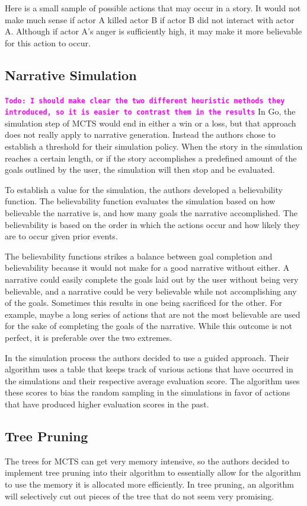 \documentclass{sig-alternate}
\newcommand{\comment}[1]{{\bf \tt  {#1}}}
\newcommand{\todo}[1]{\textcolor{magenta}{\comment{Todo: {#1}}}}
\begin{document}
Here is a small sample of possible actions that may occur in a story. It would not make much sense if actor A killed actor B if actor B did not interact with actor A. Although if actor A's anger is sufficiently high, it may make it more believable for this action to occur\cite{Narrative}.

\subsection{Narrative Simulation}
\todo{I should make clear the two different heuristic methods they introduced, so it is easier to contrast them in the results}
In Go, the simulation step of MCTS would end in either a win or a loss, but that approach does not really apply to narrative generation. Instead the authors chose to establish a threshold for their simulation policy. When the story in the simulation reaches a certain length, or if the story accomplishes a predefined amount of the goals outlined by the user, the simulation will then stop and be evaluated.

To establish a value for the simulation, the authors developed a believability function. The believability function evaluates the simulation based on how believable the narrative is, and how many goals the narrative accomplished. The believability is based on the order in which the actions occur and how likely they are to occur given prior events.

The believability functions strikes a balance between goal completion and believability because it would not make for a good narrative without either. A narrative could easily complete the goals laid out by the user without being very believable, and a narrative could be very believable while not accomplishing any of the goals. Sometimes this results in one being sacrificed for the other. For example, maybe a long series of actions that are not the most believable are used for the sake of completing the goals of the narrative. While this outcome is not perfect, it is preferable over the two extremes.

In the simulation process the authors decided to use a guided approach. Their algorithm uses a table that keeps track of various actions that have occurred in the simulations and their respective average evaluation score. The algorithm uses these scores to bias the random sampling in the simulations in favor of actions that have produced higher evaluation scores in the past. 
\subsection{Tree Pruning}
The trees for MCTS can get very memory intensive, so the authors decided to implement tree pruning into their algorithm to essentially allow for the algorithm to use the memory it is allocated more efficiently. In tree pruning, an algorithm will selectively cut out pieces of the tree that do not seem very promising.  
\end{document}
